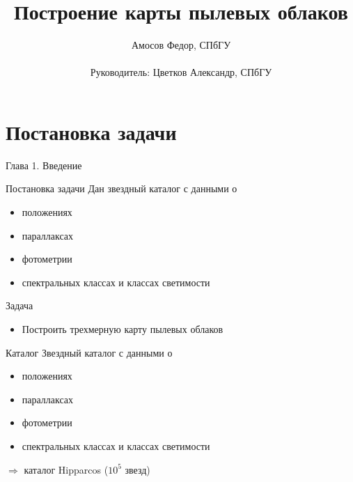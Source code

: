 \documentclass[14pt, fleqn, xcolor={dvipsnames, table}]{beamer}
\title{Построение карты пылевых облаков\\\small{}}
\author[]{
    \small{
        Амосов Федор, СПбГУ\\
        ~\\
        Руководитель: Цветков Александр, СПбГУ
    }
}
\date{}
\begin{document}
    \begin{frame}
        \maketitle
        \small
    \end{frame}

    \section{Постановка задачи}  
		
		\begin{frame}
            Глава 1. Введение        
        \end{frame}		
		
        \begin{frame}{Постановка задачи}
            Дан звездный каталог с данными о
            \begin{itemize}
                \item положениях
                \item параллаксах
                \item фотометрии
                \item спектральных классах и классах светимости
            \end{itemize}  
            Задача
            \begin{itemize}
                \item Построить трехмерную карту пылевых облаков 
            \end{itemize}         
        \end{frame}
        
        \begin{frame}{Каталог}
            Звездный каталог с данными о
            \begin{itemize}
                \item положениях
                \item параллаксах
                \item фотометрии
                \item спектральных классах и классах светимости
            \end{itemize}  
            $\Longrightarrow$ каталог Hipparcos ($10^5$ звезд)
        \end{frame}
        
\end{document}
